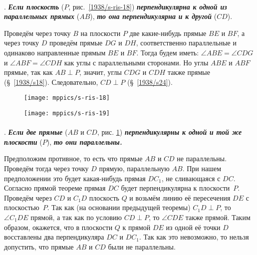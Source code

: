 \paragraph{}\label{1938/s31}
.
\textbf{\emph{Если плоскость}} ($P$, рис.~\ref{1938/s-ris-18}) \textbf{\emph{перпендикулярна к одной из параллельных прямых}} ($AB$), \textbf{\emph{то она перпендикулярна и к другой}} ($CD$).

Проведём через точку $B$ на плоскости $P$ две какие-нибудь прямые $BE$ и $BF$, а через точку $D$ проведём прямые $DG$ и $DH$, соответственно параллельные и одинаково направленные прямым $BE$ и $BF$.
Тогда будем иметь: $\angle ABE=\angle CDG$ и $\angle ABF = \angle CDH$ как углы с параллельными сторонами.
Но углы $ABE$ и $ABF$ прямые, так как $AB\perp P$, значит, углы $CDG$ и $CDH$ также прямые (§~\ref{1938/s18}).
Следовательно, $CD \perp P$ (§~\ref{1938/s24}).

\begin{figure}[!ht]
\begin{minipage}{.48\textwidth}
\centering
\texttt{[image: mppics/s-ris-18]}
\end{minipage}
\hfill
\begin{minipage}{.48\textwidth}
\centering
\texttt{[image: mppics/s-ris-19]}
\end{minipage}

\medskip

\begin{minipage}{.48\textwidth}
\centering
\caption{}\label{1938/s-ris-18}
\end{minipage}
\hfill
\begin{minipage}{.48\textwidth}
\centering
\caption{}\label{1938/s-ris-19}
\end{minipage}
\vskip-4mm
\end{figure}

\paragraph{}\label{1938/s32}
\mbox{.}
\textbf{\emph{Если две прямые}} ($AB$ и $CD$, рис. \ref{1938/s-ris-19}) \textbf{\emph{перпендикулярны к одной и той же плоскости}} ($P$), \textbf{\emph{то они параллельны.}}

Предположим противное, то есть что прямые $AB$ и $CD$ не параллельны.
Проведём тогда через точку $D$ прямую, параллельную $AB$. %
При нашем предположении это будет какая-нибудь прямая $DC_1$, не сливающаяся с $DC$.
Согласно прямой теореме прямая $DC$ будет перпендикулярна к плоскости~$P$.
Проведём через $CD$ и $C_1D$ плоскость $Q$ и возьмём линию её пересечения $DE$ с плоскостью~$P$.
Так как (на основании предыдущей теоремы) $C_1D \perp P$, то $\angle C_1DE$ прямой, а так как по условию $CD \perp P$, то $\angle CDE$ также прямой.
Таким образом, окажется, что в плоскости $Q$ к прямой $DE$ из одной её точки $D$ восставлены два перпендикуляра $DC$ и $DC_1$.
Так как это невозможно, %
то нельзя допустить, что прямые $AB$ и $CD$ были не параллельны.

